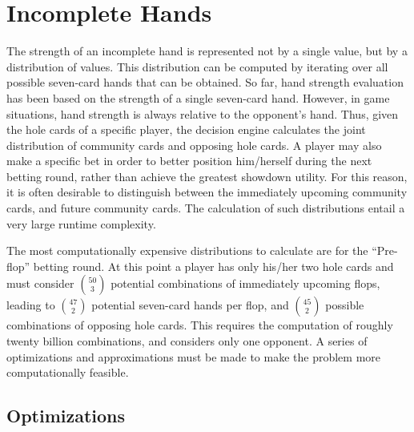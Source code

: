 \section{Incomplete Hands}
\label{sec:IncompleteHands}

The strength of an incomplete hand is represented not by a single value, but by a distribution of values.
This distribution can be computed by iterating over all possible seven-card hands that can be obtained. %
So far, hand strength evaluation has been based on the strength of a single seven-card hand.
However, in game situations, hand strength is always relative to the opponent's hand.
Thus, given the hole cards of a specific player, the decision engine calculates the joint distribution of community cards and opposing hole cards.
A player may also make a specific bet in order to better position him/herself during the next betting round, rather than achieve the greatest showdown utility.
For this reason, it is often desirable to distinguish between the immediately upcoming community cards, and future community cards.
The calculation of such distributions entail a very large runtime complexity.

The most computationally expensive distributions to calculate are for the ``Pre-flop'' betting round.
At this point a player has only his/her two hole cards and must consider $\binom{50}{3}$ potential combinations of immediately upcoming flops, leading to $\binom{47}{2}$ potential seven-card hands per flop, and $\binom{45}{2}$ possible combinations of opposing hole cards.
This requires the computation of roughly twenty billion combinations, and considers only one opponent.
A series of optimizations and approximations must be made to make the problem more computationally feasible. %

\subsection{Optimizations}
\label{sec:Optimizations}


